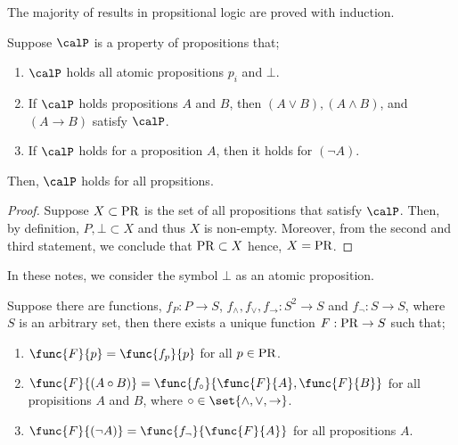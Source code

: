 The majority of results in propsitional logic are proved with induction.

\begin{theorem}
    Suppose \(\calP\) is a property of propositions that;
    \begin{enumerate}
        \item \(\calP\) holds all atomic propositions \(p_i\) and \(\bot\).
        \item If \(\calP\) holds propositions \(A\) and \(B\), then \((A \lor B), (A \land B)\), and \((A \to B)\) satisfy \(\calP\).
        \item If \(\calP\) holds for a proposition \(A\), then it holds for \((\neg A)\).
    \end{enumerate}
    Then, \(\calP\) holds for all propsitions.
\end{theorem}

\begin{proof}
    Suppose \(X \subset \operatorname{PR}\) is the set of all propositions that satisfy \(\calP\). Then, by definition, \(P,\bot \subset X\) and thus \(X\) is non-empty. Moreover, from the second and third statement, we conclude that \(\operatorname{PR} \subset X\) hence, \(X = \operatorname{PR}\).
\end{proof}

In these notes, we consider the symbol \(\bot\) as an atomic proposition.

\begin{theorem} 
    Suppose there are functions, \(f_P: P \to S\), \(f_{\land},f_{\lor}, f_{\to} : S^2 \to S\) and \(f_{\neg}: S \to S\), where \(S\) is an arbitrary set, then there exists a unique function \(F: \operatorname{PR} \to S\) such that;
    \begin{enumerate}
        \item \(\func{F}{p} = \func{f_p}{p}\) for all \(p \in \operatorname{PR}\).
        \item \(\func{F}{(A \circ B)} = \func{f_{\circ}}{\func{F}{A}, \func{F}{B}}\) for all propisitions \(A\) and \(B\), where \(\circ \in \set{\land,\lor,\to}\).
        \item \(\func{F}{(\neg A)} = \func{f_{\neg}}{\func{F}{A}}\) for all propositions \(A\).
    \end{enumerate}
\end{theorem}

